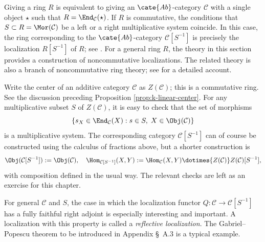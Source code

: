 \begin{example}
	Giving a ring $R$ is equivalent to giving an $\cate{Ab}$-category
	$\mathcal{C}$ with a single object $\star$ such that
	$R=\End_{\mathcal{C}}(\star)$. If $R$ is commutative, the conditions that
	$S\subset R=\Mor(\mathcal{C})$ be a left or a right multiplicative system
	coincide. In this case, the ring corresponding to the $\cate{Ab}$-category
	$\mathcal{C}[S^{-1}]$ is precisely the localization $R[S^{-1}]$ of $R$;
	see \cite[\S 5.3]{Li1}. For a general ring $R$, the theory in this section
	provides a construction of noncommutative localizations. The related theory
	is also a branch of noncommutative ring theory; see \cite[\S 10A]{Lam99}
	for a detailed account.
\end{example}

\begin{example}\label{eg:central-localization}
	Write the center of an additive category $\mathcal{C}$ as
	$Z(\mathcal{C})$; this is a commutative ring. See the discussion preceding
	Proposition \ref{prop:k-linear-center}. For any multiplicative subset $S$
	of $Z(\mathcal{C})$, it is easy to check that the set of morphisms
	\[ \{s_X \in \End_{\mathcal{C}}(X): s \in S, \; X \in \Obj(\mathcal{C}) \} \]
	is a multiplicative system. The corresponding category
	$\mathcal{C}[S^{-1}]$ can of course be constructed using the calculus of
	fractions above, but a shorter construction is
	\[ \Obj(\mathcal{C}[S^{-1}]) := \Obj(\mathcal{C}), \quad \Hom_{\mathcal{C}[S^{-1}]}(X, Y) := \Hom_{\mathcal{C}}(X, Y) \dotimes{Z(\mathcal{C})} Z(\mathcal{C})[S^{-1}], \]
	with composition defined in the usual way. The relevant checks are left as
	an exercise for this chapter.
\end{example}

\begin{remark}\label{rem:reflexive-localization}
	For general $\mathcal{C}$ and $S$, the case in which the localization
	functor $Q:\mathcal{C}\to\mathcal{C}[S^{-1}]$ has a fully faithful right
	adjoint is especially interesting and important. A localization with this
	property is called a \emph{reflective localization}. The
	Gabriel--Popescu theorem to be introduced in Appendix \S~A.3 is a
	typical example.
\end{remark}

